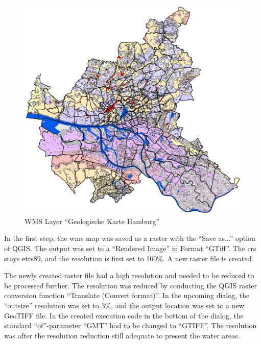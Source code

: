 \documentclass[a4paper, 11pt, oneside]{Thesis}  %
\begin{document}
\begin{figure}[h]
\includegraphics[scale=0.5]{Figures/WMS_Layer_Geologische_Karte.png}
\centering
\caption{WMS Layer ``Geologische Karte Hamburg''}
\label{fig:geologische_karte}
\end{figure}

In the first step, the \ac{wms} map was saved as a raster with the ``Save as...'' option of QGIS. The output was set to a ``Rendered Image'' in Format ``GTiff''. The \ac{crs} stays \ac{etrs89}, and the resolution is first set to 100\%. A new raster file is created.

The newly created raster file had a high resolution and needed to be reduced to be processed further. The resolution was reduced by conducting the QGIS raster conversion function ``Translate (Convert format)''. In the upcoming dialog, the ``outsize'' resolution was set to 3\%, and the output location was set to a new GeoTIFF file. In the created execution code in the bottom of the dialog, the standard ``of''-parameter ``GMT'' had to be changed to ``GTIFF''. The resolution was after the resolution reduction still adequate to present the water areas.
\end{document}

